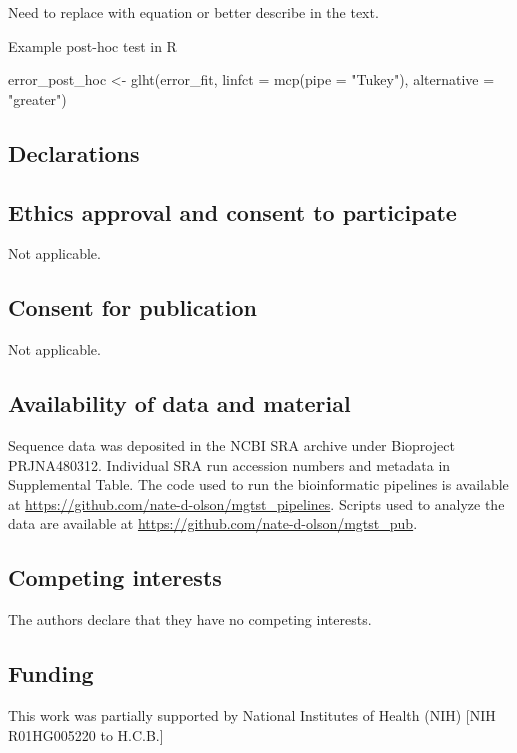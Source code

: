 \documentclass[linenumbers]{bmcart}
\begin{document}
Need to replace with equation or better describe in the text.
\begin{verbatim*}
Example post-hoc test in R

error_post_hoc <- glht(error_fit, linfct = mcp(pipe = "Tukey"), alternative = "greater")
\end{verbatim*}




\begin{backmatter}

\section*{Declarations}

\subsection*{Ethics approval and consent to participate}
Not applicable.

\subsection*{Consent for publication}
Not applicable.

\subsection*{Availability of data and material}
Sequence data was deposited in the NCBI SRA archive under Bioproject
PRJNA480312.
Individual SRA run accession numbers and metadata in Supplemental Table.
The code used to run the bioinformatic pipelines is available at
\url{https://github.com/nate-d-olson/mgtst_pipelines}.
Scripts used to analyze the data are available at
\url{https://github.com/nate-d-olson/mgtst_pub}.

\subsection*{Competing interests}
The authors declare that they have no competing interests.

\subsection*{Funding}
This work was partially supported by National Institutes of Health (NIH)
{[}NIH R01HG005220 to H.C.B.{]}


\end{backmatter}
\end{document}
